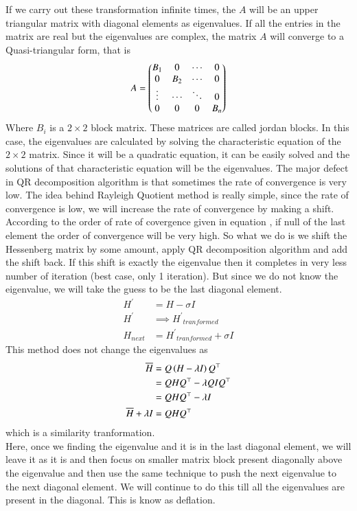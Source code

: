 \documentclass[journal]{IEEEtran}
\begin{document}
If we carry out these transformation infinite times, the $A$ will be an upper triangular matrix with diagonal elements as eigenvalues.
If all the entries in the matrix are real but the eigenvalues are complex, the matrix $A$ will converge to a Quasi-triangular form, that is
\begin{align}
	A = \begin{pmatrix}B_1 & 0 & \cdots & 0 \\
		   0 & B_2 & \cdots & 0\\
		   \vdots & \cdots & \ddots & 0\\
		   0 & 0 & 0 & B_n\end{pmatrix}
\end{align}
Where $B_i$ is a $2 \times 2$ block matrix. These matrices are called jordan blocks. In this case, the eigenvalues are calculated by solving the characteristic equation of the $2 \times 2$ matrix. Since it will be a quadratic equation, it can be easily solved and the solutions of that characteristic equation will be the eigenvalues.\newline
The major defect in QR decomposition algorithm is that sometimes the rate of convergence is very low. The idea behind Rayleigh Quotient method is really simple, since the rate of convergence is low, we will increase the rate of convergence by making a shift. According to the order of rate of covergence given in equation , if null of the last element  the order of convergence will be very high. So what we do is we shift the Hessenberg matrix by some amount, apply QR decomposition algorithm and add the shift back. If this shift is exactly the eigenvalue then it completes in very less number of iteration (best case, only 1 iteration). But since we do not know the eigenvalue, we will take the guess to be the last diagonal element.
\begin{align}
	H^\prime &= H - \sigma I\\
	H^\prime &\implies {H^\prime}_{tranformed}\\
	H_{next} &= {H^\prime}_{tranformed} + \sigma I
\end{align}
This method does not change the eigenvalues as
\begin{align}
\overline{H} &= Q\left(H - \lambda I\right)Q^\top\\
	&= QHQ^\top - \lambda QIQ^\top\\
	&= QHQ^\top - \lambda I\\
\overline{H} +\lambda I &= QHQ^\top
\end{align}
which is a similarity tranformation.\\
Here, once we finding the eigenvalue and it is in the last diagonal element, we will leave it as it is and then focus on smaller matrix block present diagonally above the eigenvalue and then use the same technique to push the next eigenvalue to the next diagonal element. We will continue to do this till all the eigenvalues are present in the diagonal. This is know as deflation.
\end{document}

